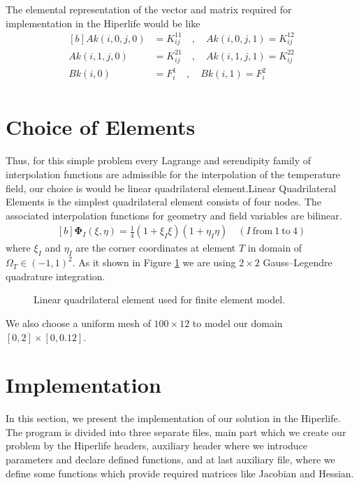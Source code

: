 \documentclass[]{article}
\begin{document}
The elemental representation of the vector and matrix required for implementation in the Hiperlife would be
like
\begin{equation}\label{eq13}
	\begin{aligned}[b]
		Ak(i,0,j,0)&=K^{11}_{ij} \quad , \quad Ak(i,0,j,1)=K^{12}_{ij}\\
		Ak(i,1,j,0)&=K^{21}_{ij}\quad , \quad Ak(i,1,j,1)=K^{22}_{ij} \\
		Bk(i,0)&=F^{1}_{i} \quad , \quad 		Bk(i,1)=F^{2}_{i}\\
	\end{aligned}
\end{equation}
\section{Choice of Elements} \label{sec: coe}
Thus, for this simple problem every Lagrange and serendipity family of interpolation functions are admissible for the interpolation of the temperature field, our choice is would be linear quadrilateral element.Linear  Quadrilateral Elements is the simplest quadrilateral element consists of four nodes. The associated interpolation functions for geometry and ﬁeld variables are bilinear.
\begin{equation}\label{eq11}
	\begin{aligned}[b]
		\boldsymbol{\Phi}_{I}(\xi, \eta) = \frac{1}{4}(1+\xi_I\xi)(1+\eta_I\eta) \quad (I \ \text{from} \ 1 \ \text{to} \ 4)
	\end{aligned}
\end{equation}
where $\xi_{I}$ and $\eta_{I}$ are the corner coordinates at element $T$ in domain of $\Omega_{T} \in (-1,1)^2$. As it shown in Figure \ref{fig_el} we are using $2 \times 2$ Gauss–Legendre quadrature integration.
\begin{figure}[htbp]
	\centering
	
	\caption{Linear quadrilateral element used for finite element model.}
	\label{fig_el}
\end{figure}

We also choose a uniform mesh of $100 \times 12$ to model our domain $[0,2] \times[0,0.12]$.
\section{Implementation} \label{sec: im}
In this section, we present the implementation of our solution in the Hiperlife. The program is divided into three separate files, main part which we create our problem by the Hiperlife headers, auxiliary header where we introduce parameters and declare defined functions, and at last auxiliary file, where we define some functions which provide required matrices like Jacobian and Hessian.
\end{document}
